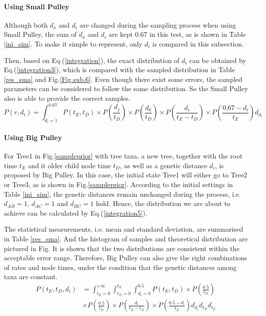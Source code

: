 \documentclass{bmcart}
\begin{document}
\paragraph*{Using Small Pulley}

Although both ${d_x}$ and ${d_i}$ are changed during the sampling process when using Small Pulley, the sum of ${d_x}$ and ${d_i}$ are kept 0.67 in this test, as is shown in Table \ref{ini_sim}. To make it simple to represent, only ${d_i}$ is compared in this subsection. 

Then, based on Eq.(\ref{integration}), the exact distribution of ${d_i}$ can be obtained by Eq.(\ref{integration3}), which is compared with the sampled distribution in Table \ref{res_sma} and Fig.\ref{Fig.sub.6}. Even though there exist some errors, the sampled parameters can be considered to follow the same distribution. So the Small Pulley also is able to provide the correct samples. 
\begin{equation}\label{integration3}
P(r,{d_i}) = \int_{{d_i} = 1}^{0.67} {P({t_E},{t_D}) \times P(\frac{{{d_j}}}{{{t_D}}}) \times P(\frac{{{d_k}}}{{{t_D}}}) \times P(\frac{{{d_i}}}{{{t_E} - {t_D}}}) \times P(\frac{{0.67 - {d_i}}}{{{t_E}}}){d_{d_i}}}
\end{equation}

\paragraph*{Using Big Pulley}

For Tree1 in Fig.\ref{sampleprior} with tree taxa, a new tree, together with the root time $t_E$ and it older child node time $t_D$, as well as a genetic distance $d_i$, is proposed by Big Pulley. In this case, the initial state Tree1 will either go to Tree2 or Tree3, as is shown in Fig.\ref{sampleprior}.  According to the initial settings in Table \ref{ini_sim}, the genetic distances remain unchanged during the process, i.e. $d_{AB} = 1$, $d_{AC}  = 1$ and $d_{BC} = 1$ hold. Hence, the distribution we are about to achieve can be calculated by Eq.(\ref{integration5}).

The statistical measurements, i.e. mean and standard deviation, are summarised in Table \ref{res_sma}. And the histogram of samples and theoretical distribution are pictured in Fig. It is shown that the two distributions are consistent within the acceptable error range. Therefore, Big Pulley can also give the right combinations of rates and node times, under the condition that the genetic distances among taxa are constant.
\begin{equation}
\label{integration5}
\begin{aligned}
P({t_E},{t_D},{d_i}) &= \int_{{t_E} = 0}^{ + \infty } {\int_{{t_D} = 0}^{{t_E}} {\int_{{d_i} = 0}^{0.5} {P({t_E},{t_D})} } \times P(\frac{{0.5}}{{{t_D}}})}  \\&\times P(\frac{{0.5}}{{{t_D}}}) \times P(\frac{{{d_i}}}{{{t_E} - {t_D}}}) \times P(\frac{{0.5 - {d_i}}}{{{t_E}}}){d_{d_i}}{d_{t_D}}{d_{t_E}}
\end{aligned}
\end{equation}
\end{document}
